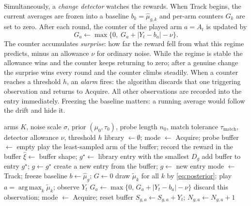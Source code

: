 \documentclass[11pt]{article}
\newcommand{\argmax}{\operatorname*{arg\,max}}
\newcommand{\taum}{\tau_{\mathrm{match}}}
\begin{document}
Simultaneously, a \emph{change detector} watches the rewards. When Track begins, the current averages are frozen into a baseline $b_k=\widehat\mu_{g,k}$ and per-arm counters $G_k$ are set to zero. After each round, the counter of the played arm $a=A_t$ is updated by
\begin{equation}
    G_a\leftarrow\max\bigl\{0,\;G_a+|Y_t-b_a|-\nu\bigr\} .
    \label{eq:cusum}
\end{equation}
The counter accumulates \emph{surprise}: how far the reward fell from what this regime predicts, minus an allowance $\nu$ for ordinary noise. While the regime is stable the allowance wins and the counter keeps returning to zero; after a genuine change the surprise wins every round and the counter climbs steadily. When a counter reaches a threshold $h$, an \emph{alarm} fires: the algorithm discards that one triggering observation and returns to Acquire. All other observations are recorded into the entry immediately. Freezing the baseline matters: a running average would follow the drift and hide it.

\begin{algorithm}[t]
\caption{Recurrence-Aware Thompson Sampling (RA-TS)}
\label{alg:rats}
\begin{algorithmic}[1]
\Require arms $K$, noise scale $\sigma$, prior $(\mu_0,\tau_0)$, probe length $n_0$, match tolerance $\taum$, detector allowance $\nu$, threshold $h$
\State library $\gets\emptyset$;\; mode $\gets$ Acquire;\; probe buffer $\gets$ empty
   \State play the least-sampled arm of the buffer; record the reward in the buffer
      \State $\widehat\xi\gets$ buffer shape;\; $g^\star\gets$ library entry with the smallest $D_g$
      \If{library nonempty \textbf{and} $D_{g^\star}\le\taum$}
         \State add buffer to entry $g^\star$;\; $g\gets g^\star$ 
      \Else
         \State create a new entry from the buffer;\; $g\gets$ new entry 
      \EndIf
      \State mode $\gets$ Track;\; freeze baseline $b\gets\widehat\mu_g$;\; $G\gets0$
   \EndIf
\Else {}
   \State draw $\widetilde\mu_k$ for all $k$ by \eqref{eq:posterior}; play $a=\argmax_k\widetilde\mu_k$; observe $Y_t$
   \State $G_a\gets\max\{0,\,G_a+|Y_t-b_a|-\nu\}$
      \State discard this observation; mode $\gets$ Acquire; reset buffer 
   \Else
      \State $S_{g,a}\gets S_{g,a}+Y_t$;\; $N_{g,a}\gets N_{g,a}+1$ 
   \EndIf
\EndIf
\EndFor
\end{algorithmic}
\end{algorithm}
\end{document}
